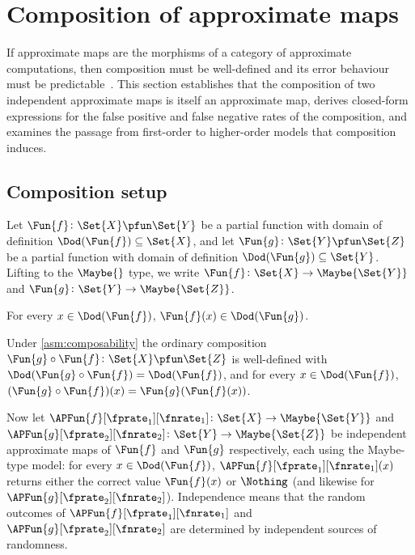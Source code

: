 \documentclass[ ../main.tex]{subfiles}
\begin{document}
\section{Composition of approximate maps}
\label{sec:composition}

If approximate maps are the morphisms of a category of approximate
computations, then composition must be well-defined and its error
behaviour must be predictable~\cite{cover2006}.  This section establishes that the
composition of two independent approximate maps is itself an approximate
map, derives closed-form expressions for the false positive and false
negative rates of the composition, and examines the passage from
first-order to higher-order models that composition induces.

\subsection{Composition setup}
\label{sec:comp-setup}

Let $\Fun{f} \colon \Set{X} \pfun \Set{Y}$ be a partial function with
domain of definition $\Dod(\Fun{f}) \subseteq \Set{X}$, and let
$\Fun{g} \colon \Set{Y} \pfun \Set{Z}$ be a partial function with
domain of definition $\Dod(\Fun{g}) \subseteq \Set{Y}$.
Lifting to the $\Maybe{}$ type, we write
$\Fun{f} \colon \Set{X} \to \Maybe{\Set{Y}}$ and
$\Fun{g} \colon \Set{Y} \to \Maybe{\Set{Z}}$.

\begin{assumption}[Composability]
\label{asm:composability}
For every $x \in \Dod(\Fun{f})$,
$\Fun{f}(x) \in \Dod(\Fun{g})$.
\end{assumption}

Under \cref{asm:composability} the ordinary composition
$\Fun{g} \circ \Fun{f} \colon \Set{X} \pfun \Set{Z}$ is well-defined
with $\Dod(\Fun{g} \circ \Fun{f}) = \Dod(\Fun{f})$, and for every
$x \in \Dod(\Fun{f})$,
$(\Fun{g} \circ \Fun{f})(x) = \Fun{g}(\Fun{f}(x))$.

Now let
$\APFun{f}[\fprate_1][\fnrate_1] \colon \Set{X} \to \Maybe{\Set{Y}}$
and
$\APFun{g}[\fprate_2][\fnrate_2] \colon \Set{Y} \to \Maybe{\Set{Z}}$
be independent approximate maps of $\Fun{f}$ and $\Fun{g}$
respectively, each using the Maybe-type model: for every
$x \in \Dod(\Fun{f})$, $\APFun{f}[\fprate_1][\fnrate_1](x)$ returns
either the correct value $\Fun{f}(x)$ or $\Nothing$ (and likewise for
$\APFun{g}[\fprate_2][\fnrate_2]$).
Independence means that the random outcomes of
$\APFun{f}[\fprate_1][\fnrate_1]$ and
$\APFun{g}[\fprate_2][\fnrate_2]$ are determined by independent
sources of randomness.
\end{document}

